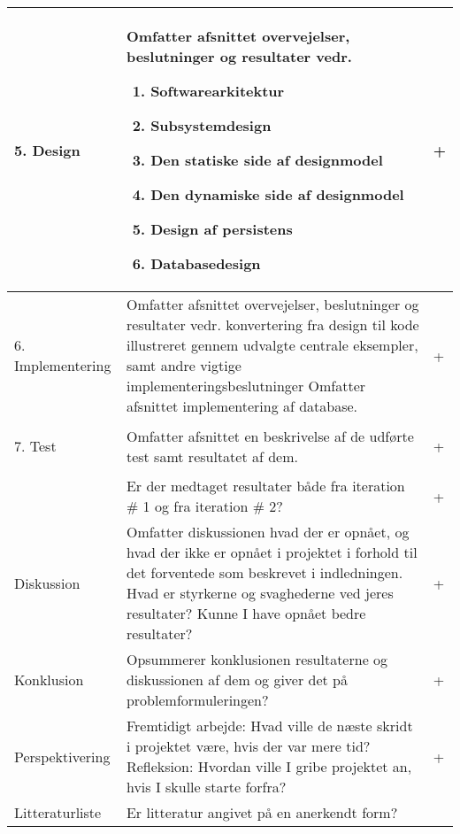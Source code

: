 \begin{center}
\begin{longtable}{|m{3.5cm}|m{10cm}|m{2.5cm}|}
\begin{flushright}
5. Design 
\end{flushright}
& Omfatter afsnittet overvejelser, beslutninger og resultater vedr. \newline
\begin{enumerate}
\item Softwarearkitektur
\item Subsystemdesign
\item Den statiske side af designmodel
\item Den dynamiske side af designmodel
\item Design af persistens
\item Databasedesign
\end{enumerate}
& +\\ \hline
\begin{flushright}
6. Implementering
\end{flushright} 
& Omfatter afsnittet overvejelser, beslutninger og resultater vedr.  konvertering fra design til kode illustreret gennem udvalgte centrale eksempler, samt andre vigtige implementeringsbeslutninger\newline
Omfatter afsnittet implementering af database. & +\\ 
\hline
\begin{flushright}
7. Test
\end{flushright}
& Omfatter afsnittet en beskrivelse af de udførte test samt resultatet af dem. & +\\
\hline
& Er der medtaget resultater både fra iteration \# 1 og fra iteration \# 2? & +\\ 
\hline
Diskussion &
Omfatter diskussionen hvad der er opnået, og hvad der ikke er opnået i projektet i forhold til det forventede som beskrevet i indledningen. \newline
Hvad er styrkerne og svaghederne ved jeres resultater? \newline
Kunne I have opnået bedre resultater?
& +\\ \hline
Konklusion & Opsummerer konklusionen resultaterne og diskussionen af dem og giver det på problemformuleringen?  & +\\
\hline
Perspektivering & 
Fremtidigt arbejde: Hvad ville de næste skridt i projektet være, hvis der var mere tid?\newline
Refleksion: Hvordan ville I gribe projektet an, hvis I skulle starte forfra? & +\\
\hline
Litteraturliste & 
Er litteratur angivet på en anerkendt form? \newline

\end{longtable}
\end{center}
